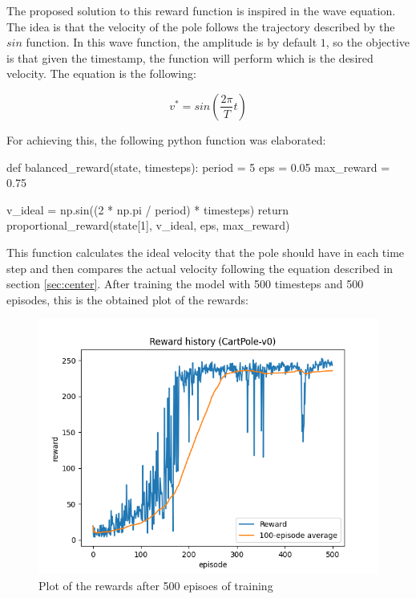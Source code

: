 \documentclass[12pt]{article}
\begin{document}
The proposed solution to this reward function is inspired in the wave equation. The idea is that the velocity of the pole follows the trajectory described by the $sin$ function. In this wave function, the amplitude is by default $1$, so the objective is that given the timestamp, the function will perform which is the desired velocity. The equation is the following:

\begin{equation}
    v^* = sin(\frac{2\pi}{T}t)
\end{equation}


For achieving this, the following python function was elaborated:

\begin{pycode}
def balanced_reward(state, timesteps):
    period = 5
    eps = 0.05
    max_reward = 0.75

    v_ideal = np.sin((2 * np.pi / period) * timesteps)
    return proportional_reward(state[1], v_ideal, eps, max_reward)
\end{pycode}

This function calculates the ideal velocity that the pole should have in each time step and then compares the actual velocity following the equation described in section \ref{sec:center}. After training the model with 500 timesteps and 500 episodes, this is the obtained plot of the rewards: \\

\begin{figure}[h]
    \centering
    \includegraphics[scale=0.4]{exercise-1/report/img/rewards/balance-500t-500e.png}
    \caption{Plot of the rewards after 500 episoes of training}
    \label{fig:my_label}
\end{figure}
\end{document}
